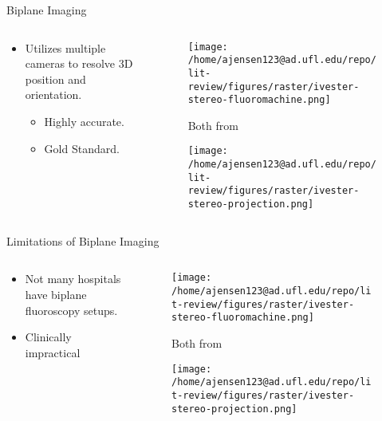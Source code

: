 \documentclass[presentation, aspectratio=1610]{beamer}
\begin{document}
\begin{frame}[label={sec:orgd10cc65}]{Biplane Imaging}
\begin{columns}
\begin{column}{0.5\columnwidth}
\begin{itemize}
\item Utilizes multiple cameras to resolve 3D position and orientation\autocites{ivesterReconfigurableHighSpeedStereoRadiography2015}[][]{burtonAutomaticTrackingHealthy2021}.
\begin{itemize}
\item Highly accurate.
\item Gold Standard.
\end{itemize}
\end{itemize}
\end{column}
\begin{column}{0.6\columnwidth}
\begin{figure}[htbp]
\centering
\texttt{[image: /home/ajensen123@ad.ufl.edu/repo/lit-review/figures/raster/ivester-stereo-fluoromachine.png]}
\caption{Both from \autocite{ivesterReconfigurableHighSpeedStereoRadiography2015}}
\end{figure}
\begin{figure}[htbp]
\centering
\texttt{[image: /home/ajensen123@ad.ufl.edu/repo/lit-review/figures/raster/ivester-stereo-projection.png]}
\end{figure}
\end{column}
\end{columns}
\end{frame}
\begin{frame}[label={sec:org200e647}]{Limitations of Biplane Imaging}
\begin{columns}
\begin{column}{0.5\columnwidth}
\begin{itemize}
\item Not many hospitals have biplane fluoroscopy setups.
\item Clinically impractical
\end{itemize}
\end{column}
\begin{column}{0.6\columnwidth}
\begin{figure}[htbp]
\centering
\texttt{[image: /home/ajensen123@ad.ufl.edu/repo/lit-review/figures/raster/ivester-stereo-fluoromachine.png]}
\caption{Both from \autocite{ivesterReconfigurableHighSpeedStereoRadiography2015}}
\end{figure}
\begin{figure}[htbp]
\centering
\texttt{[image: /home/ajensen123@ad.ufl.edu/repo/lit-review/figures/raster/ivester-stereo-projection.png]}
\end{figure}
\end{column}
\end{columns}
\end{frame}
\end{document}
